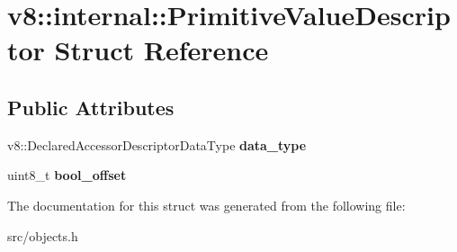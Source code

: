 \hypertarget{structv8_1_1internal_1_1_primitive_value_descriptor}{}\section{v8\+:\+:internal\+:\+:Primitive\+Value\+Descriptor Struct Reference}
\label{structv8_1_1internal_1_1_primitive_value_descriptor}
\subsection*{Public Attributes}
\begin{DoxyCompactItemize}
\item 
\hypertarget{structv8_1_1internal_1_1_primitive_value_descriptor_acab7feceae3624469e382c23b4744900}{}v8\+::\+Declared\+Accessor\+Descriptor\+Data\+Type {\bfseries data\+\_\+type}\label{structv8_1_1internal_1_1_primitive_value_descriptor_acab7feceae3624469e382c23b4744900}

\item 
\hypertarget{structv8_1_1internal_1_1_primitive_value_descriptor_a7d8c31404226f9a6a8a11b512da04604}{}uint8\+\_\+t {\bfseries bool\+\_\+offset}\label{structv8_1_1internal_1_1_primitive_value_descriptor_a7d8c31404226f9a6a8a11b512da04604}

\end{DoxyCompactItemize}


The documentation for this struct was generated from the following file\+:\begin{DoxyCompactItemize}
\item 
src/objects.\+h\end{DoxyCompactItemize}

